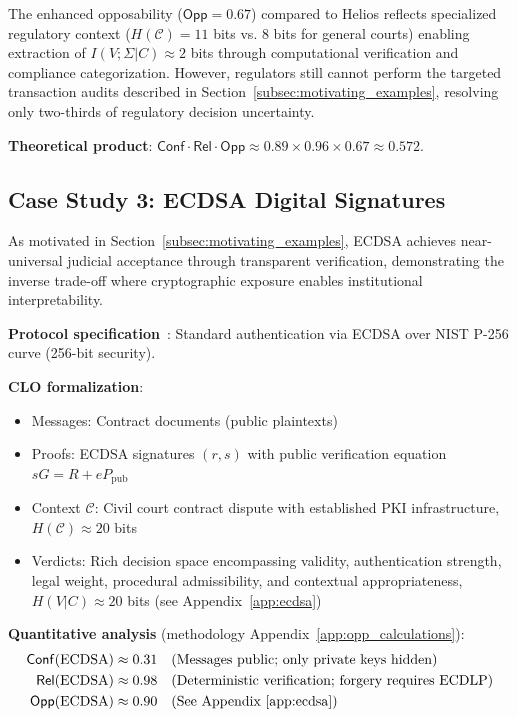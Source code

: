 \documentclass{ieeeaccess}
\begin{document}
The enhanced opposability ($\mathsf{Opp} = 0.67$) compared to Helios reflects specialized regulatory context ($H(\mathcal{C}) = 11$ bits vs. 8 bits for general courts) enabling extraction of $I(V;\Sigma|C) \approx 2$ bits through computational verification and compliance categorization. However, regulators still cannot perform the targeted transaction audits described in Section~\ref{subsec:motivating_examples}, resolving only two-thirds of regulatory decision uncertainty.

\textbf{Theoretical product}: $\mathsf{Conf} \cdot \mathsf{Rel} \cdot \mathsf{Opp} \approx 0.89 \times 0.96 \times 0.67 \approx 0.572$.

\subsection{Case Study 3: ECDSA Digital Signatures}

As motivated in Section~\ref{subsec:motivating_examples}, ECDSA achieves near-universal judicial acceptance through transparent verification, demonstrating the inverse trade-off where cryptographic exposure enables institutional interpretability.

\textbf{Protocol specification}~\cite{Johnson01}: Standard authentication via ECDSA over NIST P-256 curve (256-bit security).

\textbf{CLO formalization}:
\begin{itemize}
\item Messages: Contract documents (public plaintexts)
\item Proofs: ECDSA signatures $(r,s)$ with public verification equation $sG = R + eP_{\text{pub}}$
\item Context $\mathcal{C}$: Civil court contract dispute with established PKI infrastructure, $H(\mathcal{C}) \approx 20$ bits
\item Verdicts: Rich decision space encompassing validity, authentication strength, legal weight, procedural admissibility, and contextual appropriateness, $H(V|C) \approx 20$ bits (see Appendix~\ref{app:ecdsa})
\end{itemize}

\textbf{Quantitative analysis} (methodology Appendix~\ref{app:opp_calculations}):
\begin{align}
\mathsf{Conf}(\text{ECDSA}) &\approx 0.31 \quad \text{(Messages public; only private keys hidden)} \\
\mathsf{Rel}(\text{ECDSA}) &\approx 0.98 \quad \text{(Deterministic verification; forgery requires ECDLP)} \\
\mathsf{Opp}(\text{ECDSA}) &\approx 0.90 \quad \text{(See Appendix~\ref{app:ecdsa})}
\end{align}
\end{document}

